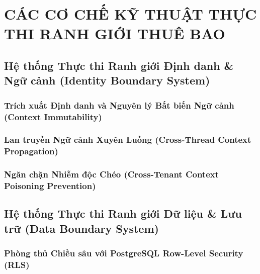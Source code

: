 \par{}
\section{CÁC CƠ CHẾ KỸ THUẬT THỰC THI RANH GIỚI THUÊ BAO}
\label{outline:2:mechanisms:1}

\par{}
\subsection{Hệ thống Thực thi Ranh giới Định danh \& Ngữ cảnh (Identity Boundary System)}
\label{outline:2:mechanisms:2}

\par{}
\subsubsection{Trích xuất Định danh và Nguyên lý Bất biến Ngữ cảnh (Context Immutability)}
\label{outline:2:mechanisms:3}

\par{}
\subsubsection{Lan truyền Ngữ cảnh Xuyên Luồng (Cross-Thread Context Propagation)}
\label{outline:2:mechanisms:4}

\par{}
\subsubsection{Ngăn chặn Nhiễm độc Chéo (Cross-Tenant Context Poisoning Prevention)}
\label{outline:2:mechanisms:5}

\par{}
\subsection{Hệ thống Thực thi Ranh giới Dữ liệu \& Lưu trữ (Data Boundary System)}
\label{outline:2:mechanisms:6}

\par{}
\subsubsection{Phòng thủ Chiều sâu với PostgreSQL Row-Level Security (RLS)}
\label{outline:2:mechanisms:7}

\par{}
